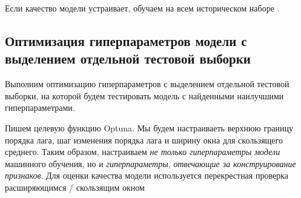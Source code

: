 \documentclass[%
	11pt,
	a4paper,
	utf8,
		]{article}
\begin{document}
Если качество модели устраивает, обучаем на всем историческом наборе \cite[]{gruzdev:time-series-2022}.

\subsection{Оптимизация гиперпараметров модели с выделением отдельной тестовой выборки}

Выполним оптимизацию гиперпараметров с выделением отдельной тестовой выборки, на которой будем тестировать модель с найденными наилучшими гиперпараметрами.

Пишем целевую функцию Optuna. Мы будем настраиваеть верхнюю границу порядка лага, шаг изменения порядка лага и ширину окна для скользящего среднего. Таким образом, настраиваем \emph{не только гиперпараметры модели} машинного обучения, но и \emph{гиперпараметры}, \emph{отвечающие за конструирование признаков}. Для оценки качества модели используется перекрестная проверка расширяющимся / скользящим окном
\end{document}
